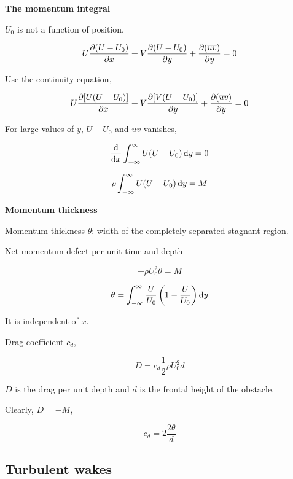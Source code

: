 \documentclass{article}
\begin{document}
\textbf{The momentum integral}

$U_0$ is not a function of position,

\begin{equation*}
    U\frac{\mathop{}\!\partial (U-U_0)}{\mathop{}\!\partial x}+V\frac{\mathop{}\!\partial (U-U_0)}{\mathop{}\!\partial y}+\frac{\mathop{}\!\partial(\overline{uv})}{\mathop{}\!\partial y}=0
\end{equation*}

Use the continuity equation,

\begin{equation*}
    U\frac{\mathop{}\!\partial [U(U-U_0)]}{\mathop{}\!\partial x}+V\frac{\mathop{}\!\partial [V(U-U_0)]}{\mathop{}\!\partial y}+\frac{\mathop{}\!\partial(\overline{uv})}{\mathop{}\!\partial y}=0
\end{equation*}

For large values of $y$, $U-U_0$ and $\overline{uv}$ vanishes,

\begin{equation*}
    \frac{\mathop{}\!\mathrm{d}}{\mathop{}\!\mathrm{d}x}\int_{-\infty}^{\infty}U(U-U_0)\mathop{}\!\mathrm{d}y=0
\end{equation*}

\begin{equation*}
    \rho\int_{-\infty}^{\infty}U(U-U_0)\mathop{}\!\mathrm{d}y=M
\end{equation*}

\textbf{Momentum thickness}

Momentum thickness $\theta$: width of the completely separated stagnant region.

Net momentum defect per unit time and depth

\begin{equation*}
    -\rho U_0^2\theta=M
\end{equation*}

\begin{equation*}
    \theta=\int_{-\infty}^{\infty}\frac{U}{U_0}\left(1-\frac{U}{U_0}\right)\mathop{}\!\mathrm{d}y
\end{equation*}

It is independent of $x$.

Drag coefficient $c_d$,

\begin{equation*}
    D=c_d\frac{1}{2}\rho U_0^2d
\end{equation*}

$D$ is the drag per unit depth and $d$ is the frontal height of the obstacle.

Clearly, $D=-M$,

\begin{equation*}
    c_d=2\frac{2\theta}{d}
\end{equation*}

\subsection{Turbulent wakes}
\end{document}

